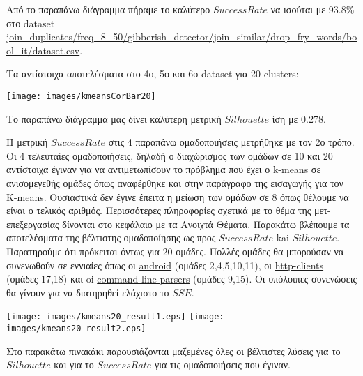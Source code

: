 Από το παραπάνω διάγραμμα πήραμε το καλύτερο $Success Rate$ να ισούται με 93.8\% στο dataset \url{join_duplicates/freq_8_50/gibberish_detector/join_similar/drop_fry_words/bool_it/dataset.csv}.

Τα αντίστοιχα αποτελέσματα στο 4ο, 5ο και 6ο dataset για 20 clusters:\\
\noindent\begin{minipage}{\linewidth}
    \centering
    \texttt{[image: images/kmeansCorBar20]}
    \label{fig:kmeansCorBar20}
\end{minipage}

Το παραπάνω διάγραμμα μας δίνει καλύτερη μετρική $Silhouette$ ίση με 0.278.

Η μετρική $Success Rate$ στις 4 παραπάνω ομαδοποιήσεις μετρήθηκε με τον 2ο τρόπο.
Οι 4 τελευταίες ομαδοποιήσεις, δηλαδή ο διαχώρισμος των ομάδων σε 10 και 20 αντίστοιχα έγιναν για να αντιμετωπίσουν το πρόβλημα που έχει ο k-means σε ανισομεγεθής ομάδες όπως αναφέρθηκε και στην παράγραφο της εισαγωγής για τον K-means. Ουσιαστικά δεν έγινε έπειτα η μείωση των ομάδων σε 8 όπως θέλουμε να είναι ο τελικός αριθμός. Περισσότερες πληροφορίες σχετικά με το θέμα της μετ-επεξεργασίας δίνονται στο κεφάλαιο με τα Ανοιχτά Θέματα.
Παρακάτω βλέπουμε τα αποτελέσματα της βέλτιστης ομαδοποίησης ως προς $Success Rate$ kai $Silhouette$. Παρατηρούμε ότι πρόκειται όντως για 20 ομάδες. Πολλές ομάδες θα μπορούσαν να συνενωθούν σε εννιαίες όπως οι \url{android} (ομάδες 2,4,5,10,11), οι \url{http-clients} (ομάδες 17,18) και oi \url{command-line-parsers} (ομάδες 9,15). Οι υπόλοιπες συνενώσεις θα γίνουν για να διατηρηθεί ελάχιστο το $SSE$.
\\\noindent\begin{minipage}{\linewidth}
    \centering
    \texttt{[image: images/kmeans20\_result1.eps]}
    \texttt{[image: images/kmeans20\_result2.eps]}
    \label{fig:kmeans20_result}
\end{minipage}
Στο παρακάτω πινακάκι παρουσιάζονται μαζεμένες όλες οι βέλτιστες λύσεις για το $Silhouette$ και για το $Success Rate$ για τις ομαδοποιήσεις που έγιναν.

